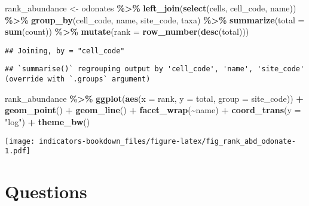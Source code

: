 \documentclass[
]{book}
\newenvironment{Shaded}{\begin{snugshade}}{\end{snugshade}}
\newcommand{\DataTypeTok}[1]{\textcolor[rgb]{0.13,0.29,0.53}{#1}}
\newcommand{\KeywordTok}[1]{\textcolor[rgb]{0.13,0.29,0.53}{\textbf{#1}}}
\newcommand{\NormalTok}[1]{#1}
\newcommand{\OperatorTok}[1]{\textcolor[rgb]{0.81,0.36,0.00}{\textbf{#1}}}
\newcommand{\StringTok}[1]{\textcolor[rgb]{0.31,0.60,0.02}{#1}}
\begin{document}
\begin{Shaded}
\begin{Highlighting}[]
\NormalTok{rank\_abundance \textless{}{-}}\StringTok{ }\NormalTok{odonates }\OperatorTok{\%\textgreater{}\%}\StringTok{ }
\StringTok{  }\KeywordTok{left\_join}\NormalTok{(}\KeywordTok{select}\NormalTok{(cells, cell\_code, name)) }\OperatorTok{\%\textgreater{}\%}\StringTok{ }
\StringTok{  }\KeywordTok{group\_by}\NormalTok{(cell\_code, name, site\_code, taxa) }\OperatorTok{\%\textgreater{}\%}\StringTok{ }
\StringTok{  }\KeywordTok{summarize}\NormalTok{(}\DataTypeTok{total =} \KeywordTok{sum}\NormalTok{(count)) }\OperatorTok{\%\textgreater{}\%}\StringTok{ }
\StringTok{  }\KeywordTok{mutate}\NormalTok{(}\DataTypeTok{rank =} \KeywordTok{row\_number}\NormalTok{(}\KeywordTok{desc}\NormalTok{(total)))}
\end{Highlighting}
\end{Shaded}

\begin{verbatim}
## Joining, by = "cell_code"
\end{verbatim}

\begin{verbatim}
## `summarise()` regrouping output by 'cell_code', 'name', 'site_code' (override with `.groups` argument)
\end{verbatim}

\begin{Shaded}
\begin{Highlighting}[]
\NormalTok{rank\_abundance }\OperatorTok{\%\textgreater{}\%}\StringTok{ }
\StringTok{  }\KeywordTok{ggplot}\NormalTok{(}\KeywordTok{aes}\NormalTok{(}\DataTypeTok{x =}\NormalTok{ rank, }\DataTypeTok{y =}\NormalTok{ total, }\DataTypeTok{group =}\NormalTok{ site\_code)) }\OperatorTok{+}\StringTok{ }
\StringTok{  }\KeywordTok{geom\_point}\NormalTok{() }\OperatorTok{+}\StringTok{ }
\StringTok{  }\KeywordTok{geom\_line}\NormalTok{() }\OperatorTok{+}\StringTok{ }
\StringTok{  }\KeywordTok{facet\_wrap}\NormalTok{(}\OperatorTok{\textasciitilde{}}\NormalTok{name) }\OperatorTok{+}\StringTok{ }
\StringTok{  }\KeywordTok{coord\_trans}\NormalTok{(}\DataTypeTok{y =} \StringTok{"log"}\NormalTok{) }\OperatorTok{+}\StringTok{ }
\StringTok{  }\KeywordTok{theme\_bw}\NormalTok{()}
\end{Highlighting}
\end{Shaded}

\texttt{[image: indicators-bookdown\_files/figure-latex/fig\_rank\_abd\_odonate-1.pdf]}

\hypertarget{questions}{%
\section{Questions}\label{questions}}
\end{document}
